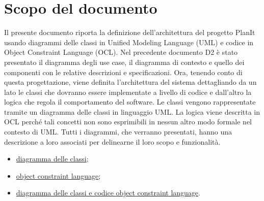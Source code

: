 \section*{Scopo del documento}
Il presente documento riporta la definizione dell'architettura del progetto PlanIt usando diagrammi delle classi in Unified Modeling Language (UML) e codice in Object Constraint Language (OCL). Nel precedente documento D2 è stato presentato il diagramma degli use case, il diagramma di contesto e quello dei componenti con le relative descrizioni e specificazioni. Ora, tenendo conto di questa progettazione, viene definita l'architettura del sistema dettagliando da un lato le classi che dovranno essere implementate a livello di codice e dall'altro la logica che regola il comportamento del software. Le classi vengono rappresentate tramite un diagramma delle classi in linguaggio UML. La logica viene descritta in OCL perché tali concetti non sono esprimibili in nessun altro modo formale nel contesto di UML. Tutti i diagrammi, che verranno presentati, hanno una descrizione a loro associati per delinearne il loro scopo e funzionalità.

\begin{itemize}
    \item \hyperref[secD3:DiagrammaDelleClassi]{diagramma delle classi};
    \item \hyperref[secD3:ObjectConstraintLanguage]{object constraint language};
    \item \hyperref[secD3:DiagrammaECodiceObjectConstraintLanguage]{diagramma delle classi e codice object constraint language}.
\end{itemize}


